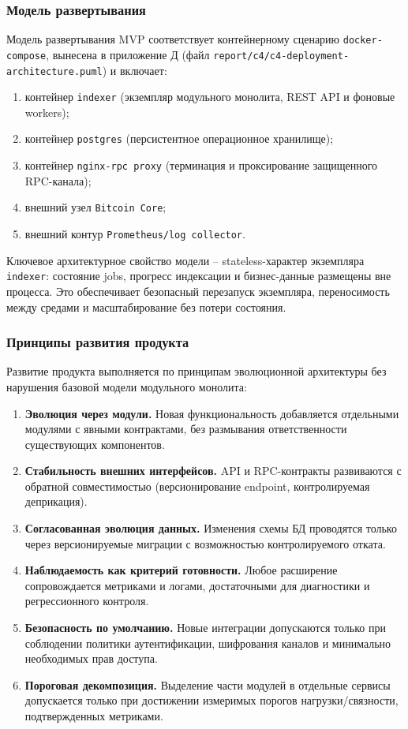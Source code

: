 ﻿\documentclass[14pt,a4paper]{extarticle}
\begin{document}
\subsubsection{Модель развертывания}
\noindent Модель развертывания MVP соответствует контейнерному сценарию \texttt{docker-compose}, вынесена в приложение Д (файл \texttt{report/c4/c4-deployment-architecture.puml}) и включает:
\begin{enumerate}
  \item контейнер \texttt{indexer} (экземпляр модульного монолита, REST API и фоновые workers);
  \item контейнер \texttt{postgres} (персистентное операционное хранилище);
  \item контейнер \texttt{nginx-rpc proxy} (терминация и проксирование защищенного RPC-канала);
  \item внешний узел \texttt{Bitcoin Core};
  \item внешний контур \texttt{Prometheus/log collector}.
\end{enumerate}
\noindent Ключевое архитектурное свойство модели -- stateless-характер экземпляра \texttt{indexer}: состояние jobs, прогресс индексации и бизнес-данные размещены вне процесса. Это обеспечивает безопасный перезапуск экземпляра, переносимость между средами и масштабирование без потери состояния.

\subsubsection{Принципы развития продукта}
\noindent Развитие продукта выполняется по принципам эволюционной архитектуры без нарушения базовой модели модульного монолита:
\begin{enumerate}
  \item \textbf{Эволюция через модули.} Новая функциональность добавляется отдельными модулями с явными контрактами, без размывания ответственности существующих компонентов.
  \item \textbf{Стабильность внешних интерфейсов.} API и RPC-контракты развиваются с обратной совместимостью (версионирование endpoint, контролируемая деприкация).
  \item \textbf{Согласованная эволюция данных.} Изменения схемы БД проводятся только через версионируемые миграции с возможностью контролируемого отката.
  \item \textbf{Наблюдаемость как критерий готовности.} Любое расширение сопровождается метриками и логами, достаточными для диагностики и регрессионного контроля.
  \item \textbf{Безопасность по умолчанию.} Новые интеграции допускаются только при соблюдении политики аутентификации, шифрования каналов и минимально необходимых прав доступа.
  \item \textbf{Пороговая декомпозиция.} Выделение части модулей в отдельные сервисы допускается только при достижении измеримых порогов нагрузки/связности, подтвержденных метриками.
\end{enumerate}
\end{document}
